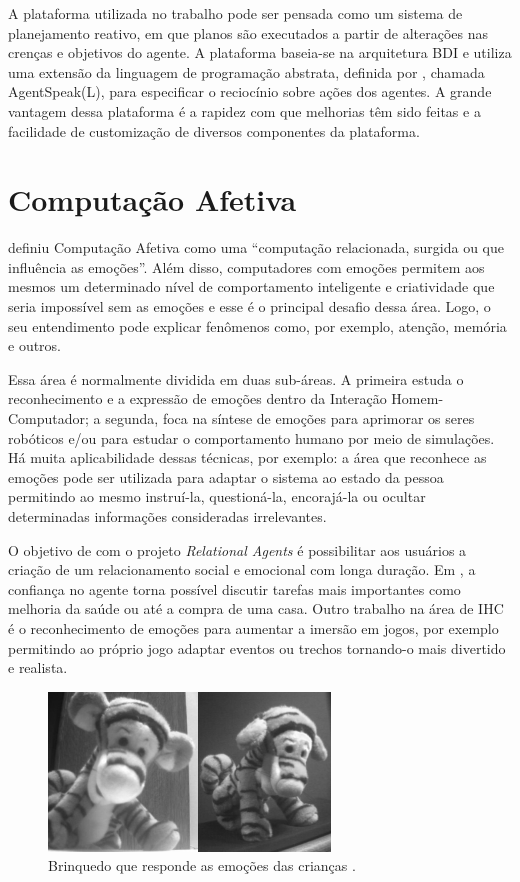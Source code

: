 A plataforma \jason \cite{bordini-jason} utilizada no trabalho pode ser
pensada como um sistema de planejamento reativo, em que planos são executados
a partir de alterações nas crenças e objetivos do agente. A plataforma
baseia-se na arquitetura BDI e utiliza uma extensão da linguagem de
programação abstrata, definida por \citet{rao1996agentspeak}, chamada
AgentSpeak(L), para especificar o reciocínio sobre ações dos agentes. A grande
vantagem dessa plataforma é a rapidez com que melhorias têm sido feitas e a
facilidade de customização de diversos componentes da plataforma.

\section{Computação Afetiva}

\citet{Pic98} definiu Computação Afetiva como uma ``computação relacionada,
surgida ou que influência as emoções''. Além disso, computadores com emoções
permitem aos mesmos um determinado nível de comportamento inteligente e
criatividade que seria impossível sem as emoções e esse é o principal desafio
dessa área. Logo, o seu entendimento pode explicar fenômenos como, por
exemplo, atenção, memória e outros.


Essa área é normalmente dividida em duas sub-áreas. A primeira estuda o
reconhecimento e a expressão de emoções dentro da Interação Homem-Computador;
a segunda, foca na síntese de emoções para aprimorar os seres robóticos e/ou
para estudar o comportamento humano por meio de simulações. Há muita
aplicabilidade dessas técnicas, por exemplo: a área que reconhece as emoções
pode ser utilizada para adaptar o sistema ao estado da pessoa permitindo ao
mesmo instruí-la, questioná-la, encorajá-la ou ocultar determinadas
informações consideradas irrelevantes.

O objetivo de \citet{bick2003relational} com o projeto \emph{Relational
Agents} é possibilitar aos usuários a criação de um relacionamento social e
emocional com longa duração.  Em \citet{bickmore2009virtual}, a confiança no
agente torna possível discutir tarefas mais importantes como melhoria da saúde
ou até a compra de uma casa. Outro trabalho na área de IHC é o reconhecimento
de emoções para aumentar a imersão em jogos, por exemplo permitindo ao próprio
jogo adaptar eventos ou trechos tornando-o mais divertido e realista.

\begin{figure}
  \begin{center}
    \includegraphics[width=75mm]{figuras/tigger-mit.png}
  \end{center}
  \caption{Brinquedo que responde as emoções das crianças \cite{kirsch1999affective}.}
  \label{fig:tigger-mit}
\end{figure}

